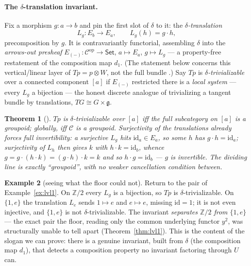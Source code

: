 \documentclass[11pt]{article}
\newtheorem{theorem}{Theorem}
\theoremstyle{definition}
\newtheorem{example}[theorem]{Example}
\newcommand{\Set}{\mathsf{Set}}
\newcommand{\Z}{\mathbb{Z}}
\newcommand{\id}{\mathrm{id}}
\newcommand{\cC}{\mathcal{C}}
\begin{document}
\paragraph{The $\delta$-translation invariant.}
Fix a morphism $g\colon a\to b$ and pin the first slot of $\delta$ to it: the
\emph{$\delta$-translation}
\[
   L_g\colon E_b\to E_a,\qquad L_g(h)=g\cdot h,
\]
precomposition by $g$. It is contravariantly functorial, assembling $\delta$ into the
\emph{arrows-out presheaf} $E_{(-)}\colon\cC^{\mathrm{op}}\to\Set$, $a\mapsto E_a$, $g\mapsto L_g$ --- a
property-free restatement of the composition map $d_1$. (The statement below concerns this
vertical/linear layer of $T p=p\otimes W$, not the full bundle \cite{MacBethDelta}.) Say $Tp$ is
\emph{$\delta$-trivializable} over a connected component $[a]$ if $E_{(-)}$ restricted there is a
\emph{local system} --- every $L_g$ a bijection --- the honest discrete analogue of trivializing a
tangent bundle by translations, $TG\cong G\times\mathfrak g$.

\begin{theorem}[\cite{MacBethDelta}]\label{thm:lvl2}
$Tp$ is $\delta$-trivializable over $[a]$ iff the full subcategory on $[a]$ is a \emph{groupoid};
globally, iff $\cC$ is a groupoid. Surjectivity of the translations already forces full invertibility:
a surjective $L_g$ hits $\id_a\in E_a$, so some $h$ has $g\cdot h=\id_a$; surjectivity of $L_h$ then
gives $k$ with $h\cdot k=\id_b$, whence $g=g\cdot(h\cdot k)=(g\cdot h)\cdot k=k$ and so $h\cdot g=\id_b$
--- $g$ is invertible. The dividing line is exactly ``groupoid'', with no weaker cancellation
condition between.
\end{theorem}

\begin{example}[seeing what the floor could not]\label{ex:lvl2}
Return to the pair of Example~\ref{ex:lvl1}. On $\Z/2$ every $L_g$ is a bijection, so $Tp$ is
$\delta$-trivializable. On $\{1,e\}$ the translation $L_e$ sends $1\mapsto e$ and $e\mapsto e$, missing
$\id=1$; it is not even injective, and $\{1,e\}$ is not $\delta$-trivializable. The invariant
\emph{separates $\Z/2$ from $\{1,e\}$} --- the exact pair the floor, reading only the common underlying
functor $y^2$, was structurally unable to tell apart (Theorem~\ref{thm:lvl1}). This is the content of
the slogan we can prove: there is a genuine invariant, built from $\delta$ (the composition map $d_1$),
that detects a composition property no invariant factoring through $U$ can.
\end{example}
\end{document}
